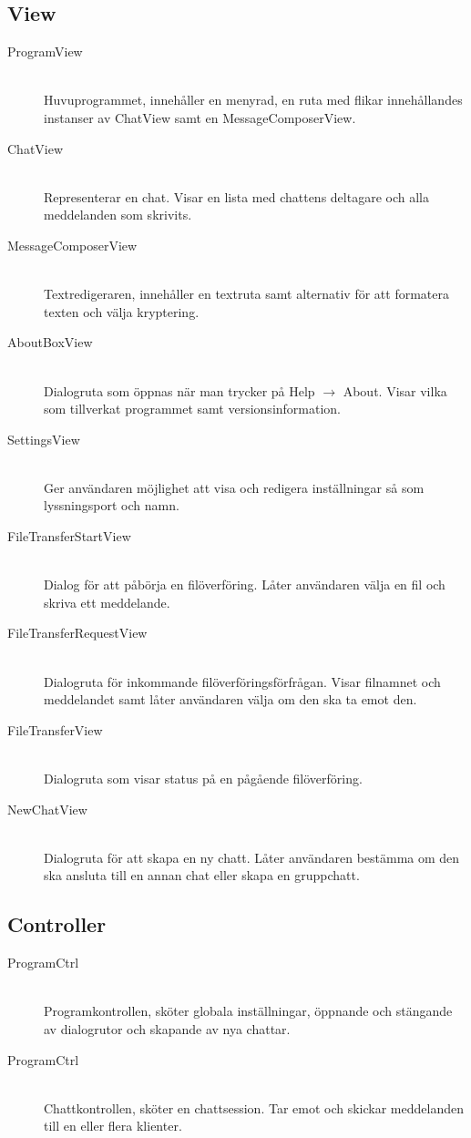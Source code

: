 \documentclass{article}
\begin{document}
\subsection{View}
\begin{description}
  \item[ProgramView] \hfill \\
  Huvuprogrammet, innehåller en menyrad, en ruta med flikar innehållandes instanser av ChatView samt en MessageComposerView.
  \item[ChatView] \hfill \\
  Representerar en chat. Visar en lista med chattens deltagare och alla meddelanden som skrivits.
  \item[MessageComposerView] \hfill \\
  Textredigeraren, innehåller en textruta samt alternativ för att formatera texten och välja kryptering.
  \item[AboutBoxView] \hfill \\
  Dialogruta som öppnas när man trycker på Help $\rightarrow$ About. Visar vilka som tillverkat programmet samt versionsinformation.
  \item[SettingsView] \hfill \\
  Ger användaren möjlighet att visa och redigera inställningar så som lyssningsport och namn.
  \item[FileTransferStartView] \hfill \\
  Dialog för att påbörja en filöverföring. Låter användaren välja en fil och skriva ett meddelande.
  \item[FileTransferRequestView] \hfill \\
  Dialogruta för inkommande filöverföringsförfrågan. Visar filnamnet och meddelandet samt låter användaren välja om den ska ta emot den.
  \item[FileTransferView] \hfill \\
  Dialogruta som visar status på en pågående filöverföring.
  \item[NewChatView] \hfill \\
  Dialogruta för att skapa en ny chatt. Låter användaren bestämma om den ska ansluta till en annan chat eller skapa en gruppchatt.
\end{description}

\subsection{Controller}
\begin{description}
  \item[ProgramCtrl] \hfill \\
  Programkontrollen, sköter globala inställningar, öppnande och stängande av dialogrutor och skapande av nya chattar.
\item[ProgramCtrl] \hfill \\
  Chattkontrollen, sköter en chattsession. Tar emot och skickar meddelanden till en eller flera klienter.
\end{description}
\end{document}
